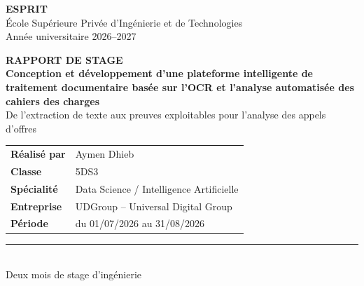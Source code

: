 \begin{titlepage}
\thispagestyle{empty}
\vspace*{11mm}
\begin{center}
{\fontsize{29}{32}\selectfont\bfseries\color{espritred} ESPRIT}\\[2mm]
{\large École Supérieure Privée d'Ingénierie et de Technologies}\\[2mm]
{\normalsize Année universitaire 2026--2027}
\end{center}
\vspace{31mm}
\begin{center}
{\Large\bfseries RAPPORT DE STAGE}\\[12mm]
{\fontsize{20}{25}\selectfont\bfseries\color{ink} Conception et développement d'une plateforme intelligente de traitement documentaire basée sur l'OCR et l'analyse automatisée des cahiers des charges}\\[7mm]
{\large\color{slate} De l'extraction de texte aux preuves exploitables pour l'analyse des appels d'offres}
\end{center}
\vfill
\begin{center}
\begin{tabular}{@{}>{\bfseries}p{42mm}p{100mm}@{}}
Réalisé par & Aymen Dhieb\\
Classe & 5DS3\\
Spécialité & Data Science / Intelligence Artificielle\\
Entreprise & UDGroup -- Universal Digital Group\\
Période & du 01/07/2026 au 31/08/2026\\
\end{tabular}
\end{center}
\vspace{17mm}
\begin{center}\color{slate}\rule{65mm}{0.5pt}\\[2mm] Deux mois de stage d'ingénierie\end{center}
\end{titlepage}
